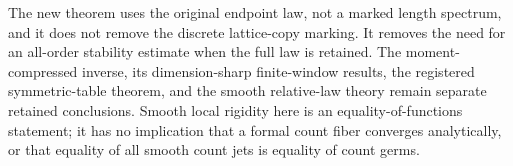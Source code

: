 The new theorem uses the original endpoint law, not a marked length
spectrum, and it does not remove the discrete lattice-copy marking.
It removes the need for an all-order stability estimate when the full
law is retained. The moment-compressed inverse, its dimension-sharp
finite-window results, the registered symmetric-table theorem, and
the smooth relative-law theory remain separate retained conclusions.
Smooth local rigidity here is an equality-of-functions statement; it
has no implication that a formal count fiber converges analytically,
or that equality of all smooth count jets is equality of count germs.
